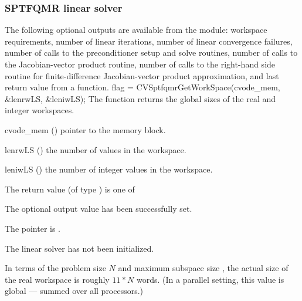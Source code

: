 
\subsubsection{SPTFQMR linear solver}\label{sss:optout_sptfqmr}
The following optional outputs are available from the {\cvsptfqmr}
module: workspace requirements, number of linear iterations, number of
linear convergence failures, number of calls to the preconditioner
setup and solve routines, number of calls to the Jacobian-vector
product routine, number of calls to the right-hand side routine for
finite-difference Jacobian-vector product approximation, and last
return value from a {\cvsptfqmr} function.
{
  flag = CVSptfqmrGetWorkSpace(cvode\_mem, \&lenrwLS, \&leniwLS);
}
{
  The function  returns the global sizes of the
  {\cvsptfqmr} real and integer workspaces.
}
{
  \begin{args}
  \item[cvode\_mem] ()
    pointer to the {\cvodes} memory block.
  \item[lenrwLS] ()
    the number of  values in the {\cvsptfqmr} workspace.
  \item[leniwLS] ()
    the number of integer values in the {\cvsptfqmr} workspace.
  \end{args}
}
{
  The return value  (of type ) is one of
  \begin{args}
  \item[\Id{CVSPTFQMR\_SUCCESS}] 
    The optional output value has been successfully set.
  \item[\Id{CVSPTFQMR\_MEM\_NULL}]
    The  pointer is .
  \item[\Id{CVSPTFQMR\_LMEM\_NULL}]
    The {\cvsptfqmr} linear solver has not been initialized.
  \end{args}
}
{
  In terms of the problem size $N$ and maximum subspace size , 
  the actual size of the real workspace is roughly  $11*N$  words.
  (In a parallel setting, this value is global --- summed over all processors.)
}
